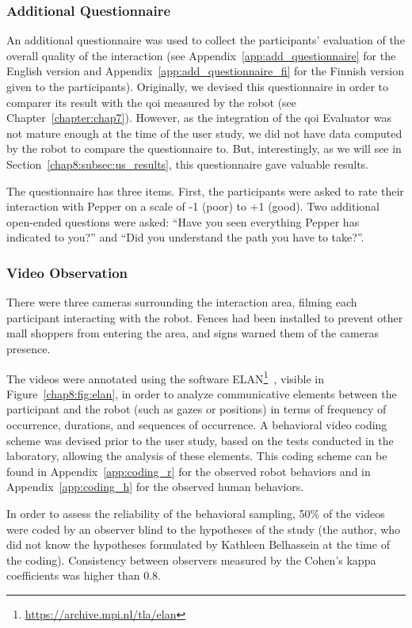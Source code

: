 \documentclass[a4paper,11pt,twoside]{StyleThese}
\begin{document}
\subsubsection{Additional Questionnaire}
An additional questionnaire was used to collect the participants' evaluation of the overall quality of the interaction (see Appendix~\ref{app:add_questionnaire} for the English version and Appendix~\ref{app:add_questionnaire_fi} for the Finnish version given to the participants). Originally, we devised this questionnaire in order to comparer its result with the \acrshort{qoi} measured by the robot (see Chapter~\ref{chapter:chap7}). However, as the integration of the \acrshort{qoi} Evaluator was not mature enough at the time of the user study, we did not have data computed by the robot to compare the questionnaire to. But, interestingly, as we will see in Section~\ref{chap8:subsec:us_results}, this questionnaire gave valuable results.

The questionnaire has three items. First, the participants were asked to rate their interaction with Pepper on a scale of -1 (poor) to +1 (good). Two additional open-ended questions were asked: ``Have you seen everything Pepper has indicated to you?'' and ``Did you understand the path you have to take?''. 


\subsubsection{Video Observation}

There were three cameras surrounding the interaction area, filming each participant interacting with the robot. Fences had been installed to prevent other mall shoppers from entering the area, and signs warned them of the cameras presence.

The videos were annotated using the software ELAN\footnote{\url{https://archive.mpi.nl/tla/elan}}~\citep{wittenburg_2006_elan}, visible in Figure~\ref{chap8:fig:elan}, in order to analyze communicative elements between the participant and the robot (such as gazes or positions) in terms of frequency of occurrence, durations, and sequences of occurrence. A behavioral video coding scheme was devised prior to the user study, based on the tests conducted in the laboratory, allowing the analysis of these elements. This coding scheme can be found in Appendix~\ref{app:coding_r} for the observed robot behaviors and in Appendix~\ref{app:coding_h} for the observed human behaviors. 

In order to assess the reliability of the behavioral sampling, 50\% of the videos were coded by an observer blind to the hypotheses of the study (\ie the author, who did not know the hypotheses formulated by Kathleen Belhassein at the time of the coding). Consistency between observers measured by the Cohen’s kappa coefficients was higher than 0.8.
\end{document}
